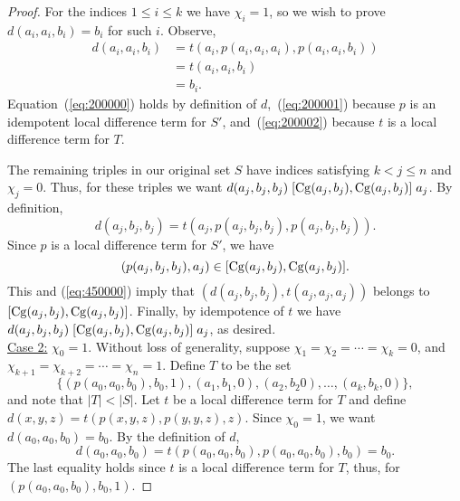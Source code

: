 \documentclass[12pt]{amsart}
\numberwithin{equation}{section}
\theoremstyle{plain}
\theoremstyle{definition}
\begin{document}
\begin{proof}
For the indices $1\leq i \leq k$ we have $\chi_i =1$, so we wish to prove
$d(a_i,a_i,b_i) = b_i$ for such $i$. Observe,
\begin{align}
  d(a_i,a_i,b_i) &=
  t(a_i, p(a_i,a_i,a_i), p(a_i,a_i,b_i)) \label{eq:200000}\\
  &=t(a_i, a_i, b_i) \label{eq:200001}\\
  &=b_i. \label{eq:200002}
\end{align}
Equation~(\ref{eq:200000}) holds by definition of $d$,~(\ref{eq:200001})
because $p$ is an idempotent local difference term for
$S'$, and~(\ref{eq:200002}) because $t$ is a local difference term for $T$.

The remaining triples in our original set $S$
have indices satisfying $k<j\leq n$ and $\chi_j = 0$.
Thus, for these triples we want
$d(a_j,b_j,b_j)\mathrel{[\operatorname{Cg}(a_j,b_j), \operatorname{Cg}(a_j,b_j)]} a_j$.
By definition,
\begin{equation}
  \label{eq:450000}
d(a_j,b_j,b_j) =t(a_j, p(a_j,b_j,b_j), p(a_j,b_j,b_j)).  
\end{equation}
Since $p$ is a local difference term for $S'$, we have
\[
(p(a_j,b_j,b_j), a_j)\in [\operatorname{Cg}(a_j,b_j), \operatorname{Cg}(a_j,b_j)].
\]
This and 
(\ref{eq:450000}) imply
that 
$(d(a_j, b_j,b_j), t(a_j,a_j,a_j))$
belongs to
$\mathrel{[\operatorname{Cg}(a_j,b_j), \operatorname{Cg}(a_j,b_j)]}$.
Finally, by idempotence of $t$ we have
$d(a_j,b_j,b_j)\mathrel{[\operatorname{Cg}(a_j,b_j), \operatorname{Cg}(a_j,b_j)]} a_j$,
as desired.
\\[6pt]
\underline{Case 2:}
$\chi_0 = 1$.
Without loss of generality, suppose $\chi_1 = \chi_2 =\cdots =\chi_k = 0$,
and $\chi_{k+1} = \chi_{k+2} = \cdots = \chi_{n} = 1$. Define $T$ to be the set
\[
\{(p(a_0, a_0, b_0), b_0, 1),
(a_1, b_1, 0), (a_2, b_2 0), \dots, (a_k, b_k, 0)\},
\]
and note that $|T| < |S|$.
Let $t$ be a local difference term for $T$ and
define
$d(x,y,z) = t(p(x,y,z), p(y,y,z), z)$. 
Since $\chi_0 =1$, we want $d(a_0,a_0,b_0) = b_0$. By the definition of
$d$,
\begin{equation*}
  d(a_0,a_0,b_0) =
  t(p(a_0,a_0,b_0), p(a_0,a_0,b_0), b_0) =b_0.
\end{equation*}
The last equality holds since $t$ is a local difference term for $T$, thus,
for $(p(a_0, a_0, b_0), b_0, 1)$.


\end{proof}
\end{document}
